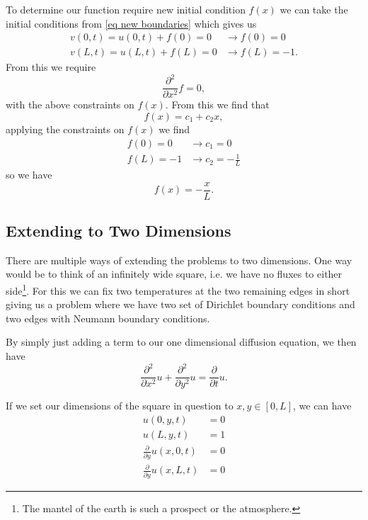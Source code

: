 \documentclass[%
reprint,
nofootinbib,
amsmath,amssymb,
aps,
]{revtex4-1}
\newcommand{\fracpt}{\frac{\partial}{\partial t}}
\newcommand{\fracpxx}{\frac{\partial^2}{\partial x^2}}
\newcommand{\fracpyy}{\frac{\partial^2}{\partial y^2}}
\begin{document}
To determine our function require new initial condition $f(x)$ we can take the initial conditions from \eqref{eq new boundaries} which gives us 
\begin{equation}
	\begin{split}
		v(0,t) = u(0,t) + f(0) = 0 &\rightarrow f(0) = 0\\
		v(L,t) = u(L,t) + f(L) = 0 &\rightarrow f(L) = -1.
	\end{split}
\end{equation}
From this we require 
\begin{equation}
	\fracpxx f = 0,
\end{equation}
with the above constraints on $f(x)$. From this we find that 
\begin{equation}
	f(x) = c_1 + c_2x,
\end{equation}
applying the constraints on $f(x)$ we find 
\begin{equation}
	\begin{split}
		f(0) = 0 &\rightarrow c_1 = 0\\
		f(L) = -1 &\rightarrow c_2 = -\frac{1}{L}
	\end{split}
\end{equation}
so we have 
\begin{equation}\label{eq f(x)}
	f(x) = -\frac{x}{L}.
\end{equation}

\subsection{Extending to Two Dimensions}
There are multiple ways of extending the problems to two dimensions. One way would be to think of an infinitely wide square, i.e. we have no fluxes to either side\footnote{The mantel of the earth is such a prospect or the atmosphere.}. For this we can fix two temperatures at the two remaining edges in short giving us a problem where we have two set of Dirichlet boundary conditions and two edges with Neumann boundary conditions. 

By simply just adding a term to our one dimensional diffusion equation, we then have 
\begin{equation}\label{eq diffusion 2d}
	\fracpxx u + \fracpyy u = \fracpt u.
\end{equation}

If we set our dimensions of the square in question to $x,y\in [0,L]$, we can have 
\begin{equation}
	\begin{split}
		u(0,y,t) &= 0\\
		u(L,y,t) &= 1\\
		\frac{\partial}{\partial y}u(x,0,t) &= 0\\
		\frac{\partial}{\partial y}u(x,L,t) &= 0
	\end{split}
\end{equation}
\end{document}
